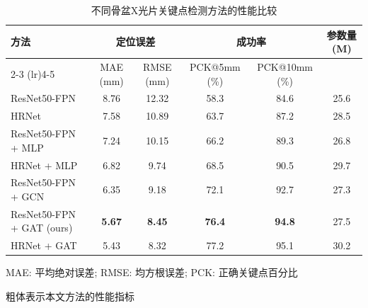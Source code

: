 
\begin{table}[htbp]
    \centering
    \caption{不同骨盆X光片关键点检测方法的性能比较}
    \label{tab:model_comparison}
    \begin{threeparttable}
        \begin{tabular}{lccccc}
            \toprule
            \multirow{2}{*}{方法} & \multicolumn{2}{c}{定位误差} & \multicolumn{2}{c}{成功率} & \multirow{2}{*}{参数量 (M)} \\
            \cmidrule(lr){2-3} \cmidrule(lr){4-5}
            & MAE (mm) & RMSE (mm) & PCK@5mm (\%) & PCK@10mm (\%) & \\
            \midrule
            ResNet50-FPN & 8.76 & 12.32 & 58.3 & 84.6 & 25.6 \\
            HRNet & 7.58 & 10.89 & 63.7 & 87.2 & 28.5 \\
            ResNet50-FPN + MLP & 7.24 & 10.15 & 66.2 & 89.3 & 26.8 \\
            HRNet + MLP & 6.82 & 9.74 & 68.5 & 90.5 & 29.7 \\
            ResNet50-FPN + GCN & 6.35 & 9.18 & 72.1 & 92.7 & 27.3 \\
            ResNet50-FPN + GAT (ours) & \textbf{5.67} & \textbf{8.45} & \textbf{76.4} & \textbf{94.8} & 27.5 \\
            HRNet + GAT & 5.43 & 8.32 & 77.2 & 95.1 & 30.2 \\
        \end{tabular}
        \begin{tablenotes}
            \footnotesize
            \item[*] MAE: 平均绝对误差; RMSE: 均方根误差; PCK: 正确关键点百分比
            \item 粗体表示本文方法的性能指标
        \end{tablenotes}
    \end{threeparttable}
\end{table}

